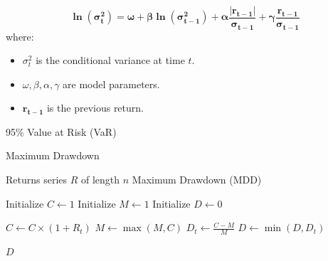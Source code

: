 \documentclass[3p,times,procedia]{elsarticle}
\begin{document}
\begin{equation}
\bm{\ln(\sigma_t^2) = \omega + \beta \ln(\sigma_{t-1}^2) + \alpha \frac{|r_{t-1}|}{\sigma_{t-1}} + \gamma \frac{r_{t-1}}{\sigma_{t-1}}}
\end{equation}
where:
\begin{itemize}
    \item $\sigma_t^2$ is the conditional variance at time $t$.
    \item $\omega, \beta, \alpha, \gamma$ are model parameters.
    \item $\bm{r_{t-1}}$ is the previous return.
\end{itemize}

\begin{center}
95\% Value at Risk (VaR)
\end{center}

\begin{algorithm}
\caption{Maximum Drawdown}
\label{alg:max_drawdown}
\begin{algorithmic}[1]
    \Require Returns series \( R \) of length \( n \)
    \Ensure Maximum Drawdown (MDD)
    
    \State Initialize \( C \gets 1 \) 
    \State Initialize \( M \gets 1 \) 
    \State Initialize \( D \gets 0 \) 

        \State \( C \gets C \times (1 + R_t) \) 
        \State \( M \gets \max(M, C) \) 
        \State \( D_t \gets \frac{C - M}{M} \) 
        \State \( D \gets \min(D, D_t) \) 
    \EndFor

    \State \Return \( D \)
\end{algorithmic}
\end{algorithm}

\vspace{1cm}
\end{document}
